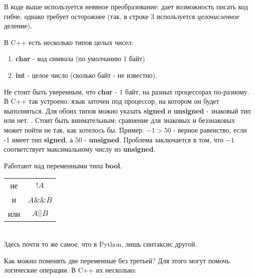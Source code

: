 \begin{lecture}[\lectureSubject]
\begin{lecSection}
	\end{lecSection}
	\begin{lecSection}
		В коде выше используется неявное преобразование: дает возможность писать код гибче, однако требует осторожнее (так, в строке 3 используется \textit{целочисленное} деление).
	\end{lecSection}
	\begin{lecSection}
		В C++ есть несколько типов целых чисел:
		\begin{enumerate}
			\item \textbf{char} - код символа (по умолчанию 1 байт)
			\item \textbf{int} - целое число (сколько байт - не известно).
		\end{enumerate}
		Не стоит быть уверенным, что \textbf{char} - 1 байт, на разных процессорах по-разному. В C++ так устроено: язык заточен под процессор, на котором он будет выполняться. Для обоих типов можно указать \textbf{signed} и \textbf{unsigned} - знаковый тип или нет.
		. Стоит быть внимательным: сравнение для знаковых и беззнаковых может пойти не так, как хотелось бы. Пример:
		$-1 > 50$ - верное равенство, если -1 имеет тип \textbf{signed}, а 50 - \textbf{unsigned}. Проблема заключается в том, что $-1$ соответствует максимальному числу из \textbf{unsigned}.
	\end{lecSection}
	\begin{lecSection}
		Работают над переменными типа \textbf{bool}.\\
		\begin{tabular}{cc}
			\multicolumn{1}{c|}{не} & $!A$ \\
			\multicolumn{1}{c|}{и} & $A\&\&B$ \\
			\multicolumn{1}{c|}{или} & $A || B$ \\
		\end{tabular}\\
		\vspace*{5pt}
		Здесь почти то же самое, что в Python, лишь синтаксис другой.
	\end{lecSection}
	\begin{lecSection}
		Как можно поменять две переменные без третьей? Для этого могут помочь логические операции. В C++ их несколько:
		\begin{enumerate}

\end{enumerate}
\end{lecSection}
\end{lecture}
